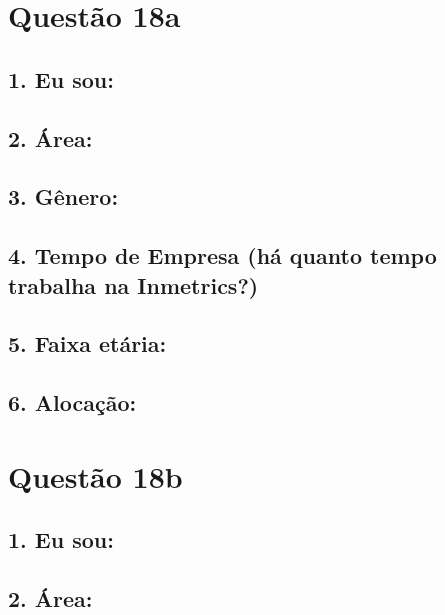 \documentclass[]{book}
\begin{document}
\hypertarget{questao-18a}{%
\section{Questão 18a}\label{questao-18a}}

\hypertarget{eu-sou-40}{%
\subsection{1. Eu sou:}\label{eu-sou-40}}

\hypertarget{area-40}{%
\subsection{2. Área:}\label{area-40}}

\hypertarget{genero-40}{%
\subsection{3. Gênero:}\label{genero-40}}

\hypertarget{tempo-de-empresa-ha-quanto-tempo-trabalha-na-inmetrics-40}{%
\subsection{4. Tempo de Empresa (há quanto tempo trabalha na Inmetrics?)}\label{tempo-de-empresa-ha-quanto-tempo-trabalha-na-inmetrics-40}}

\hypertarget{faixa-etaria-40}{%
\subsection{5. Faixa etária:}\label{faixa-etaria-40}}

\hypertarget{alocacao-40}{%
\subsection{6. Alocação:}\label{alocacao-40}}

\hypertarget{questao-18b}{%
\section{Questão 18b}\label{questao-18b}}

\hypertarget{eu-sou-41}{%
\subsection{1. Eu sou:}\label{eu-sou-41}}

\hypertarget{area-41}{%
\subsection{2. Área:}\label{area-41}}
\end{document}
